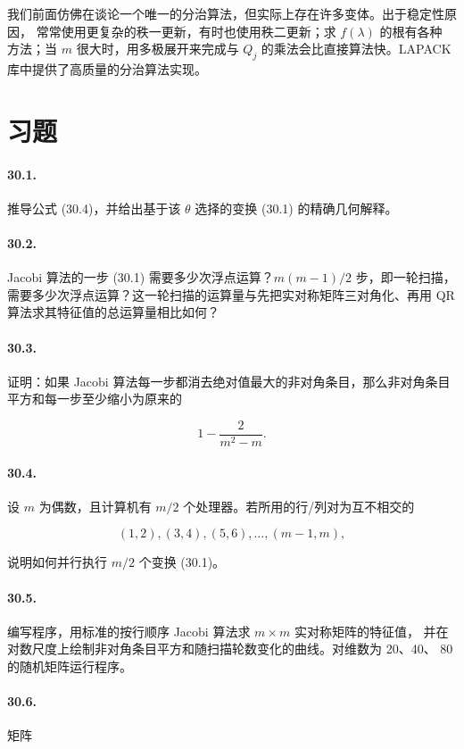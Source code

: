 \documentclass[UTF8,fontset=none,12pt]{ctexart}
\begin{document}
我们前面仿佛在谈论一个唯一的分治算法，但实际上存在许多变体。出于稳定性原因，
常常使用更复杂的秩一更新，有时也使用秩二更新；求 $f(\lambda)$ 的根有各种
方法；当 $m$ 很大时，用多极展开来完成与 $Q_j$ 的乘法会比直接算法快。LAPACK
库中提供了高质量的分治算法实现。

\section*{习题}

\paragraph{30.1.}
推导公式 (30.4)，并给出基于该 $\theta$ 选择的变换 (30.1) 的精确几何解释。

\paragraph{30.2.}
Jacobi 算法的一步 (30.1) 需要多少次浮点运算？$m(m-1)/2$ 步，即一轮扫描，
需要多少次浮点运算？这一轮扫描的运算量与先把实对称矩阵三对角化、再用 QR
算法求其特征值的总运算量相比如何？

\paragraph{30.3.}
证明：如果 Jacobi 算法每一步都消去绝对值最大的非对角条目，那么非对角条目
平方和每一步至少缩小为原来的

$$
1-\frac{2}{m^2-m}.
$$

\paragraph{30.4.}
设 $m$ 为偶数，且计算机有 $m/2$ 个处理器。若所用的行/列对为互不相交的

$$
(1,2),(3,4),(5,6),\ldots,(m-1,m),
$$

说明如何并行执行 $m/2$ 个变换 (30.1)。

\paragraph{30.5.}
编写程序，用标准的按行顺序 Jacobi 算法求 $m\times m$ 实对称矩阵的特征值，
并在对数尺度上绘制非对角条目平方和随扫描轮数变化的曲线。对维数为 20、40、
80 的随机矩阵运行程序。

\paragraph{30.6.}
矩阵
\end{document}
